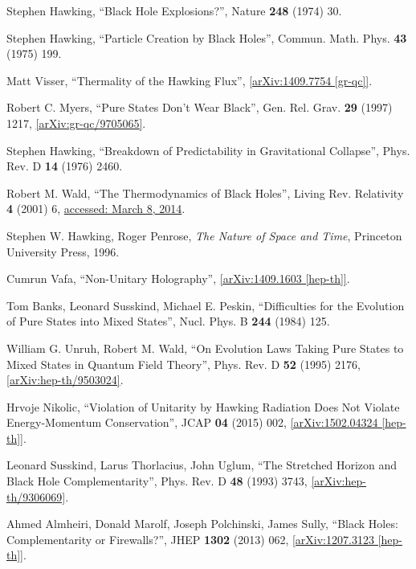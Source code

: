 \documentclass[12pt]{article}
\newcommand{\2}{$^2$}
\newcommand{\3}{$^3$}
\newcommand{\4}{$_4$}
\newcommand{\5}{$_5$}
\begin{document}
\begin{thebibliography}{400}

Stephen Hawking, ``Black Hole Explosions?'', Nature \textbf{248} (1974) 30.

Stephen Hawking, ``Particle Creation by Black Holes'', Commun. Math. Phys. \textbf{43} (1975) 199.

Matt Visser, ``Thermality of the Hawking Flux'', \href{http://arxiv.org/abs/1409.7754}{[arXiv:1409.7754 [gr-qc]]}.

Robert C. Myers, ``Pure States Don't Wear Black'', Gen. Rel. Grav. \textbf{29} (1997) 1217, \href{http://arxiv.org/abs/gr-qc/9705065}{[arXiv:gr-qc/9705065]}.

Stephen Hawking, ``Breakdown of Predictability in Gravitational Collapse'', Phys. Rev. D \textbf{14} (1976) 2460.


Robert M. Wald, ``The Thermodynamics of Black Holes'', 
Living Rev. Relativity \textbf{4} (2001) 6, \href{http://www.livingreviews.org/lrr-2001-6}{accessed: March 8, 2014}.

Stephen W. Hawking, Roger Penrose, \emph{The Nature of Space and Time}, Princeton University Press, 1996. 

Cumrun Vafa, ``Non-Unitary Holography'', \href{http://arxiv.org/abs/1409.1603}{[arXiv:1409.1603 [hep-th]]}.


Tom Banks, Leonard Susskind, Michael E. Peskin, ``Difficulties for the Evolution of Pure States into Mixed States'', Nucl. Phys. B \textbf{244} (1984) 125. 

William G. Unruh, Robert M. Wald, 
``On Evolution Laws Taking Pure States to Mixed States in Quantum Field Theory'',
Phys. Rev. D \textbf{52} (1995) 2176, \href{http://arxiv.org/abs/hep-th/9503024}{[arXiv:hep-th/9503024]}.

Hrvoje Nikolic, ``Violation of Unitarity by Hawking Radiation Does Not Violate Energy-Momentum Conservation'', JCAP \textbf{04} (2015) 002, \href{http://arxiv.org/abs/1502.04324}{[arXiv:1502.04324 [hep-th]]}.

Leonard Susskind, Larus Thorlacius, John Uglum, ``The Stretched Horizon and Black
Hole Complementarity'', Phys. Rev. D \textbf{48} (1993) 3743, \href{http://arxiv.org/abs/hep-th/9306069}{[arXiv:hep-th/9306069]}.

Ahmed Almheiri, Donald Marolf, Joseph Polchinski, James Sully, ``Black Holes: Complementarity or Firewalls?'', JHEP \textbf{1302} (2013) 062, \href{http://arxiv.org/abs/1207.3123}{[arXiv:1207.3123 [hep-th]]}.


\end{thebibliography}
\end{document}
